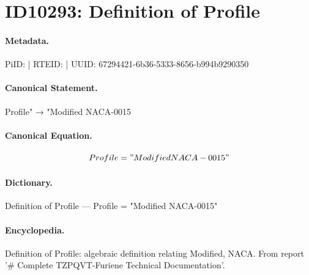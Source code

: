 \section*{ID10293: Definition of Profile}
\paragraph{Metadata.}
PiID:  | RTEID:  | UUID: 67294421-6b36-5333-8656-b994b9290350

\paragraph{Canonical Statement.}
Profile" → "Modified NACA-0015

\paragraph{Canonical Equation.}
\[
Profile = "Modified NACA-0015"
\]

\paragraph{Dictionary.}
Definition of Profile — Profile = "Modified NACA-0015"

\paragraph{Encyclopedia.}
Definition of Profile: algebraic definition relating Modified, NACA. From report '\# Complete TZPQVT-Furiene Technical Documentation'.
